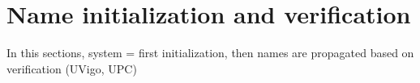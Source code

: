 \section{Name initialization and verification}
\label{sec:clustering}

In this sections, system = first initialization, then names are propagated based on verification (UVigo, UPC)

\endinput
